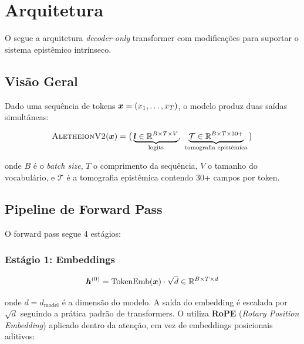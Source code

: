 
\section{Arquitetura}
\label{sec:arquitetura}

O \aletheion{} segue a arquitetura \textit{decoder-only} transformer
\cite{vaswani2017attention, radford2019gpt2} com modifica\c{c}\~oes para
suportar o sistema epist\^emico intr\'inseco.

\subsection{Vis\~ao Geral}

Dado uma sequ\^encia de tokens $\bm{x} = (x_1, \ldots, x_T)$, o modelo produz
duas sa\'idas simult\^aneas:

\begin{equation}
    \text{\textsc{AletheionV2}{}}(\bm{x}) = \big(\underbrace{\bm{l} \in \mathbb{R}^{B \times T \times V}}_{\text{logits}},\
    \underbrace{\mathcal{T} \in \mathbb{R}^{B \times T \times 30+}}_{\text{tomografia epist\^emica}}\big)
\end{equation}

onde $B$ \'e o \textit{batch size}, $T$ o comprimento da sequ\^encia, $V$ o
tamanho do vocabul\'ario, e $\mathcal{T}$ \'e a tomografia epist\^emica contendo
30+ campos por token.

\subsection{Pipeline de Forward Pass}

O forward pass segue 4 est\'agios:

\subsubsection{Est\'agio 1: Embeddings}

\begin{equation}
    \bm{h}^{(0)} = \text{TokenEmb}(\bm{x}) \cdot \sqrt{d} \in \mathbb{R}^{B \times T \times d}
\end{equation}

onde $d = d_{\text{model}}$ \'e a dimens\~ao do modelo. A sa\'ida do embedding
\'e escalada por $\sqrt{d}$ seguindo a pr\'atica padr\~ao de transformers.
O \aletheion{} utiliza
\textbf{RoPE} (\textit{Rotary Position Embedding}) \cite{su2021roformer}
aplicado dentro da aten\c{c}\~ao, em vez de embeddings posicionais aditivos:

